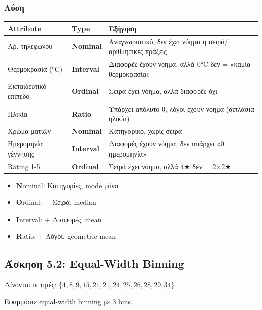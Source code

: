 \subsubsection*{Λύση}

\begin{center}
\begin{tabular}{llp{7cm}}
\toprule
\textbf{Attribute} & \textbf{Type} & \textbf{Εξήγηση} \\
\midrule
Αρ. τηλεφώνου & \textbf{Nominal} & Αναγνωριστικό, δεν έχει νόημα η σειρά/αριθμητικές πράξεις \\
Θερμοκρασία (°C) & \textbf{Interval} & Διαφορές έχουν νόημα, αλλά 0°C δεν = «καμία θερμοκρασία» \\
Εκπαιδευτικό επίπεδο & \textbf{Ordinal} & Σειρά έχει νόημα, αλλά διαφορές όχι \\
Ηλικία & \textbf{Ratio} & Υπάρχει απόλυτο 0, λόγοι έχουν νόημα (διπλάσια ηλικία) \\
Χρώμα ματιών & \textbf{Nominal} & Κατηγορικό, χωρίς σειρά \\
Ημερομηνία γέννησης & \textbf{Interval} & Διαφορές έχουν νόημα, δεν υπάρχει «0 ημερομηνία» \\
Rating 1-5 & \textbf{Ordinal} & Σειρά έχει νόημα, αλλά 4★ δεν = 2×2★ \\
\bottomrule
\end{tabular}
\end{center}

\begin{infobox}
\begin{itemize}
    \item \textbf{N}ominal: Κατηγορίες, mode μόνο
    \item \textbf{O}rdinal: + Σειρά, median
    \item \textbf{I}nterval: + Διαφορές, mean
    \item \textbf{R}atio: + Λόγοι, geometric mean
\end{itemize}
\end{infobox}

\subsection{Άσκηση 5.2: Equal-Width Binning}

\begin{formulabox}[Εκφώνηση]
Δίνονται οι τιμές: $\{4, 8, 9, 15, 21, 21, 24, 25, 26, 28, 29, 34\}$

Εφαρμόστε equal-width binning με 3 bins.
\end{formulabox}

